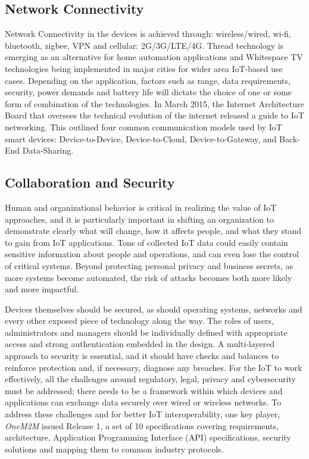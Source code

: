 \documentclass[sigconf]{acmart}
\begin{document}
	\subsection{Network Connectivity}
	Network Connectivity in the devices is achieved through: wireless/wired, wi-fi, bluetooth, zigbee, VPN and cellular: 2G/3G/LTE/4G. Thread technology is emerging as an alternative for home automation applications and Whitespace TV technologies being implemented in major cities for wider area IoT-based use cases. Depending on the application, factors such as range, data requirements, security, power demands and battery life will dictate the choice of one or some form of combination of the technologies. In March 2015, the Internet Architecture Board that oversees the technical evolution of the internet released a guide to IoT networking. This outlined four common communication models used by IoT smart devices: Device-to-Device, Device-to-Cloud, Device-to-Gateway, and Back-End Data-Sharing\cite{internet-society}.
	
	\subsection{Collaboration and Security}
	Human and organizational behavior is critical in realizing the value of IoT approaches, and it is particularly important in shifting an organization to demonstrate clearly what will change, how it affects people, and what they stand to gain from IoT applications. Tons of collected IoT data could easily contain sensitive information about people and operations, and can even lose the control of critical systems. Beyond protecting personal privacy and business secrets, as more systems become automated, the risk of attacks becomes both more likely and more impactful. 
	
	Devices themselves should be secured, as should operating systems, networks and every other exposed piece of technology along the way. The roles of users, administrators and managers should be individually defined with appropriate access and strong authentication embedded in the design. A multi-layered approach to security is essential, and it should have checks and balances to reinforce protection and, if necessary, diagnose any breaches. For the IoT to work effectively, all the challenges around regulatory, legal, privacy and cybersecurity must be addressed; there needs to be a framework within which devices and applications can exchange data securely over wired or wireless networks. To address these challenges and for better IoT interoperability, one key player, {\em OneM2M} issued Release 1, a set of 10 specifications covering requirements, architecture, Application Programming Interface (API) specifications, security solutions and mapping them to common industry protocols\cite{one-m2m}.
	
\end{document}
